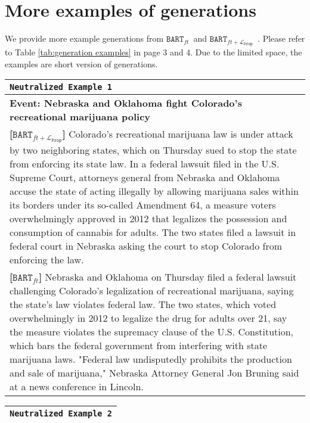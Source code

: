 \documentclass[11pt,a4paper]{article}
\newcommand{\finetune}{$\texttt{BART}_{ft}$}
\newcommand{\prop}{$\texttt{BART}_{ft+\mathcal{L}_\texttt{Prop}}$}
\begin{document}
\section{More examples of generations}
We provide more example generations from \finetune~and \prop~. Please refer to Table \ref{tab:generation examples} in page 3 and 4. Due to the limited space, the examples are short version of generations.

\begin{table*}[t]
    \centering
    \begin{tabular}{p{15cm}}
    \toprule
    \texttt{Neutralized Example 1}\\\midrule
        \textbf{Event: Nebraska and Oklahoma fight Colorado's recreational marijuana policy}\\\midrule
        \textbf{[\prop]} Colorado's recreational marijuana law is under attack by two neighboring states, which on Thursday sued to stop the state from enforcing its state law. In a federal lawsuit filed in the U.S. Supreme Court, attorneys general from Nebraska and Oklahoma accuse the state of acting illegally by allowing marijuana sales within its borders under its so-called Amendment 64, a measure voters overwhelmingly approved in 2012 that legalizes the possession and consumption of cannabis for adults. The two states filed a lawsuit in federal court in Nebraska asking the court to stop Colorado from enforcing the law.\\\midrule
        \textbf{[\finetune]} Nebraska and Oklahoma on Thursday filed a federal lawsuit challenging Colorado's legalization of recreational marijuana, saying the state's law violates federal law. The two states, which voted overwhelmingly in 2012 to legalize the drug for adults over 21, say the measure violates the supremacy clause of the U.S. Constitution, which bars the federal government from interfering with state marijuana laws. "Federal law undisputedly prohibits the production and sale of marijuana," Nebraska Attorney General Jon Bruning said at a news conference in Lincoln.\\\bottomrule
    \end{tabular}
     \centering
    \begin{tabular}{p{15cm}}
    \\
    \toprule
        \texttt{Neutralized Example 2}\\\midrule


\end{tabular}
\end{table*}
\end{document}
